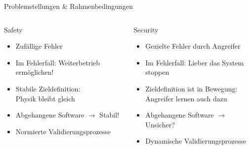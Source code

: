 \begin{frame}[T]{Problemstellungen \& Rahmenbedingungen}
\small
  \begin{columns}[t,fullwidth]
   \hfill
    \begin{column}{.45\linewidth}
      \begin{block}{Safety}
      \begin{itemize}
        \item Zufällige Fehler
        \item Im Fehlerfall: Weiterbetrieb ermöglichen!
        \item Stabile Zieldefinition:\\Physik bleibt gleich
        \item Abgehangene Software $\rightarrow$ Stabil!
        \item Normierte Validierungsprozesse
      \end{itemize}
      \end{block}
    \end{column}
    \hfill
    \begin{column}{.45\linewidth}
      \begin{block}{Security}
      \begin{itemize}
        \item Gezielte Fehler durch Angreifer
        \item Im Fehlerfall: Lieber das System stoppen
        \item Zieldefinition ist in Bewegung:\\Angreifer lernen auch dazu
        \item Abgehangene Software $\rightarrow$ Unsicher?
        \item Dynamische Validierungsprozesse
      \end{itemize}
      \end{block}
    \end{column}
    \hfill
  \end{columns}
\end{frame}


\begingroup
\ExplSyntaxOn
{}
\newcommand*{\Level}[1]{
	\str_case:nnF {#1} {
		{+}{\cellcolor{green3}+}
		{++}{\cellcolor{green2}+\,+}
		{+++}{\cellcolor{green1}+\,+\,+}
		{-}{\cellcolor{red!10}}
	}
	{#1}
}
\ExplSyntaxOff

